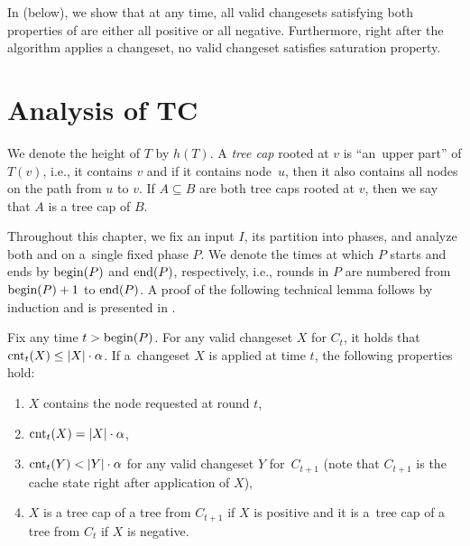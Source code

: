 In  (below), we show that at any
time, all valid changesets satisfying both properties of \ALGTC are either all
positive or all negative. Furthermore, right after the algorithm applies a
changeset, no valid changeset satisfies saturation property.



\section{Analysis of TC}
\label{sec:analysis}

We denote the height of $T$ by $h(T)$.  A
\emph{tree cap} rooted at $v$ is ``an~upper part'' of $T(v)$, i.e., it
contains $v$ and if it contains node~$u$, then it also contains all nodes on
the path from $u$ to $v$. If $A \subseteq B$ are both tree caps rooted at $v$,
then we say that $A$ is a tree cap of $B$.


Throughout this chapter, we fix an input $I$, its partition into phases, and
analyze both \ALGTC and \OPT on a~single fixed phase $P$. We denote the times at
which $P$ starts and ends by $\textrm{begin}(P)$ and $\textrm{end}(P)$, respectively, i.e., rounds in
$P$ are numbered from $\textrm{begin}(P)+1$ to $\textrm{end}(P)$. A proof of the following technical
lemma follows by induction and is presented in 
.


\begin{lemma}
\label{lem:no_over-requested_changesets}
Fix any time $t > \textrm{begin}(P)$. For any valid changeset $X$ for $C_t$, it holds that
$\textrm{cnt}_t(X) \leq |X| \cdot \alpha$. If a~changeset $X$ is applied at time $t$,
the following properties hold:
\begin{enumerate}
\item $X$ contains the node requested at round $t$, 
\label{lemit:1}
\item $\textrm{cnt}_t(X) = |X| \cdot \alpha$, 
\label{lemit:2}
\item $\textrm{cnt}_t(Y) < |Y| \cdot \alpha$ for any valid changeset $Y$ for~$C_{t+1}$
(note that $C_{t+1}$ is the cache state right after application of $X$),
\label{lemit:3}
\item $X$ is a tree cap of a tree from $C_{t+1}$ if
$X$ is positive and it is a~tree cap of a tree from $C_t$ if $X$ is
negative.
\label{lemit:4}
\end{enumerate}
\end{lemma}

